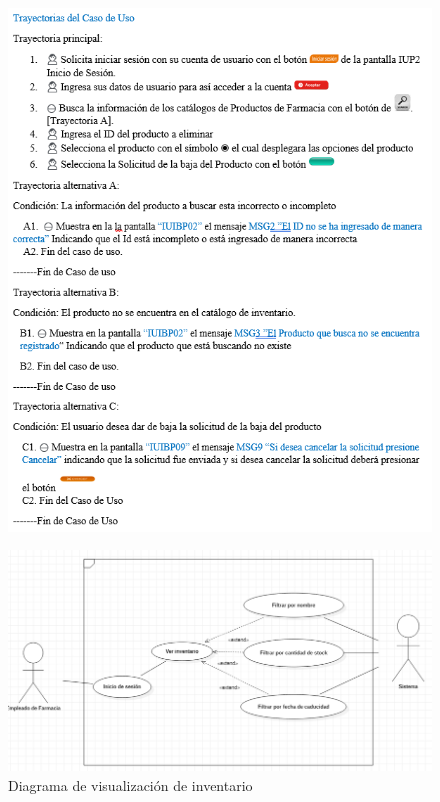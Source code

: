 \documentclass[12pt,letterpaper]{article}
\begin{document}
{\begin{figure}[!htb]
        \end{figure}
        \begin{figure}[!htb]
            \centering
            \includegraphics [scale=0.9]{trayectoriaBajaMedicamento}
        \end{figure}
        \begin{figure}[!htb]
            \centering
            \includegraphics [scale=0.5]{verInventario}
            \caption{Diagrama de visualización de inventario}

\end{figure}}
\end{document}
